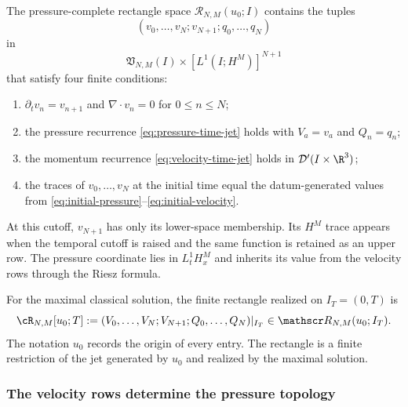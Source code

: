The pressure-complete rectangle space
\(\mathscr R_{N,M}(u_0;I)\) contains the tuples
\begin{equation*}
 (v_0,\ldots,v_N;v_{N+1};q_0,\ldots,q_N)
\end{equation*}
in
\begin{equation*}
 \mathfrak V_{N,M}(I)
 \times[L^1(I;H^M)]^{N+1}
\end{equation*}
that satisfy four finite conditions:
\begin{enumerate}
 \item \(\partial_tv_n=v_{n+1}\) and \(\nabla\cdot v_n=0\) for
       \(0\le n\le N\);
 \item the pressure recurrence \eqref{eq:pressure-time-jet} holds with
       \(V_a=v_a\) and \(Q_n=q_n\);
 \item the momentum recurrence \eqref{eq:velocity-time-jet} holds in
       \(\mathcal D'(I\times\R^3)\);
 \item the traces of \(v_0,\ldots,v_N\) at the initial time equal the
       datum-generated values from
       \eqref{eq:initial-pressure}--\eqref{eq:initial-velocity}.
\end{enumerate}
At this cutoff, \(v_{N+1}\) has only its lower-space membership.  Its
\(H^M\) trace appears when the temporal cutoff is raised and the same function
is retained as an upper row.  The pressure coordinate lies in
\(L^1_tH^M_x\) and inherits its value from the velocity rows through the
Riesz formula.

For the maximal classical solution, the finite rectangle realized on
\(I_T=(0,T)\) is
\begin{equation*}
 \cR_{N,M}[u_0;T]
 :=(V_0,\ldots,V_N;V_{N+1};Q_0,\ldots,Q_N)|_{I_T}
 \in\mathscr R_{N,M}(u_0;I_T).
\end{equation*}
The notation \(u_0\) records the origin of every entry.  The rectangle is a finite
restriction of the jet generated by \(u_0\) and realized by the maximal
solution.

\subsubsection{The velocity rows determine the pressure topology}

